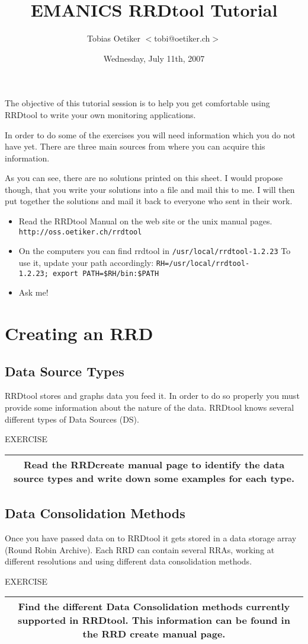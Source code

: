 \documentclass[a4paper,12pt]{article}
\title{EMANICS RRDtool Tutorial}
\date{Wednesday, July 11th, 2007}
\author{Tobias Oetiker $<$tobi@oetiker.ch$>$}
\newenvironment{work}{\textsf{\tiny EXERCISE}\nopagebreak\\[0.3ex]\begin{tabular}{|c|}
 \hline
 \begin{minipage}{0.965\linewidth}%
 \setlength{\parskip}{1.6ex plus 0.6ex minus 0.4ex}%
 \rule{0pt}{2.8ex}\ignorespaces}
{\rule[-1.8ex]{0pt}{0pt}\end{minipage}\\
 \hline
 \end{tabular}}
\newcommand{\ex}[1]{\subsection{#1}}
\newcommand{\cmd}[1]{\texttt{\mbox{#1}}}
\begin{document}
\maketitle

The objective of this tutorial session is to help you get comfortable using
RRDtool to write your own monitoring applications.

In order to do some of the exercises you will need information which
you do not have yet. There are three main sources from where you can
acquire this information.

As you can see, there are no solutions printed on this sheet. I would
propose though, that you write your solutions into a file and mail
this to me. I will then put together the solutions and mail it back
to everyone who sent in their work.

\begin{itemize}
\item Read the RRDtool Manual on the web site or the unix manual
  pages.\\ \cmd{http://oss.oetiker.ch/rrdtool}
\item On the computers you can find rrdtool in \cmd{/usr/local/rrdtool-1.2.23}
  To use it, update your path accordingly:
\cmd{RH=/usr/local/rrdtool-1.2.23; export PATH=\$RH/bin:\$PATH}
\item Ask me!
\end{itemize}

\newpage
\section{Creating an RRD}
\ex{Data Source Types}

RRDtool stores and graphs data you feed it. In order to do so
properly you must provide some information about the nature of the
data. RRDtool knows several different types of Data Sources (DS).

\begin{work}
  Read the RRDcreate manual page to identify the data source types
  and write down some examples for each type.
\end{work}

\ex{Data Consolidation Methods}

Once you have passed data on to RRDtool it gets stored in a data
storage array (Round Robin Archive). Each RRD can contain several
RRAs, working at different resolutions and using different data
consolidation methods.

\begin{work}
  Find the different Data Consolidation methods currently supported in
  RRDtool. This information can be found in the RRD create manual
  page.
\end{work}
\end{document}
